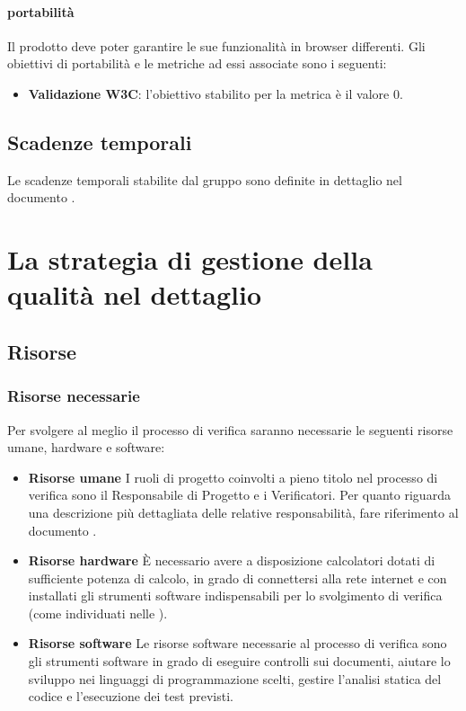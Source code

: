 			\paragraph{portabilità}
		 	Il prodotto deve poter garantire le sue funzionalità in browser differenti.
		 	Gli obiettivi di portabilità e le metriche ad essi associate sono i seguenti:
		 	\begin{itemize}
				\item \textbf{Validazione W3C}: l'obiettivo stabilito per la metrica è il valore 0.
			\end{itemize}
	\subsection{Scadenze temporali}
	Le scadenze temporali stabilite dal gruppo sono definite in dettaglio nel documento \PdP.




\section{La strategia di gestione della qualità nel dettaglio}
	\subsection{Risorse}
		\subsubsection{Risorse necessarie}
		Per svolgere al meglio il processo di verifica saranno necessarie le seguenti risorse umane, hardware e software:
		\begin{itemize}
			\item \textbf{Risorse umane}
			I ruoli di progetto coinvolti a pieno titolo nel processo di verifica sono il Responsabile di Progetto e i Verificatori. Per quanto riguarda una descrizione più dettagliata delle relative responsabilità, fare riferimento al documento \NdP.
			\item \textbf{Risorse hardware}
			  È necessario avere a disposizione calcolatori dotati di sufficiente potenza di calcolo, in grado di connettersi alla rete internet e con installati gli strumenti software indispensabili per lo svolgimento di verifica (come individuati nelle \NdP).
			\item \textbf{Risorse software}
			Le risorse software necessarie al processo di verifica sono gli strumenti software in grado di eseguire controlli sui documenti, aiutare lo sviluppo nei linguaggi di programmazione scelti, gestire l'analisi statica del codice e l'esecuzione dei test previsti.
		\end{itemize}
